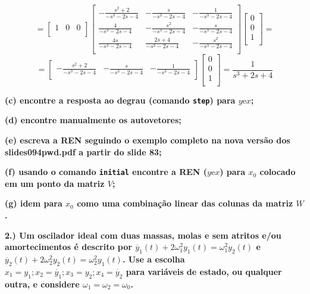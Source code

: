\documentclass[11pt]{article}
\begin{document}
\[=
  \left[ {\begin{array}{ccc}
    1 & 0 & 0 \\
  \end{array} } \right]
  \left[ \begin{array}{rcr}
    -\frac{s^2 + 2}{-s^3-2s-4} & -\frac{s}{-s^3-2s-4}  & -\frac{1}{-s^3-2s-4} \\ 
    \frac{4}{-s^3-2s-4} & -\frac{s^2}{-s^3-2s-4} & -\frac{s}{-s^3-2s-4} \\
    \frac{4s}{-s^3-2s-4} & \frac{2s+4}{-s^3-2s-4}  & -\frac{s^2}{-s^3-2s-4} \\
  \end{array} \right]
  \left[ {\begin{array}{c}
    0 \\
    0 \\
    1 \\
  \end{array} } \right]
  =
  \] 
  \[
    =
  \left[ {\begin{array}{ccc}
    -\frac{s^2 + 2}{-s^3-2s-4} & -\frac{s}{-s^3-2s-4} & -\frac{1}{-s^3-2s-4} \\
  \end{array} } \right]
  \left[ {\begin{array}{c}
    0 \\
    0 \\
    1 \\
  \end{array} } \right]
  = \frac{1}{s^3 + 2s + 4}
\]

\vspace{\baselineskip}

\textbf{(c) encontre a resposta ao degrau (comando \texttt{step}) para $y \text{e} x$;}

\textbf{(d) encontre manualmente os autovetores;}

\textbf{(e) escreva a REN seguindo o exemplo completo na nova versão dos slides094pwd.pdf a partir do slide 83;}

\textbf{(f) usando o comando \texttt{initial} encontre a REN ($y \text{e} x$) para $x_0$ colocado em um ponto da matriz $V$;}

\textbf{(g) idem para $x_0$ como uma combinação linear das colunas da matriz $W$.}


\vspace{\baselineskip}

\textbf{2.) Um oscilador ideal com duas massas, molas e sem atritos e/ou amortecimentos é descrito por $\ddot{y_1}(t) + 2\omega_1^2 y_1(t) = \omega_1^2 y_2(t)$ e $\ddot{y_2}(t) + 2\omega_2^2 y_2(t) = \omega_2^2 y_1(t)$. Use a escolha $x_1 = y_1; x_2 = \dot{y_1}; x_3 = y_2; x_4 = \dot{y_2}$ para variáveis de estado, ou qualquer outra, e considere $\omega_1 = \omega_2 = \omega_0$.}
\end{document}
